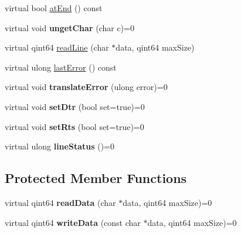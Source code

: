 \begin{DoxyCompactItemize}
\item 
virtual bool \mbox{\hyperlink{class_qext_serial_base_a06cb503e03af3a372abc715ac7fbb63c}{at\+End}} () const
\item 
\mbox{\label{class_qext_serial_base_ad4564cb1b1fdfb317e6a12cb5b351adf}} 
virtual void {\bfseries unget\+Char} (char c)=0
\item 
virtual qint64 \mbox{\hyperlink{class_qext_serial_base_aee681a896845c9594c84dcd47d7eb566}{read\+Line}} (char $\ast$data, qint64 max\+Size)
\item 
virtual ulong \mbox{\hyperlink{class_qext_serial_base_a5889db7f578e11db0c7980de3720deea}{last\+Error}} () const
\item 
\mbox{\label{class_qext_serial_base_aa9c2e9272cff3bd576560335308a8033}} 
virtual void {\bfseries translate\+Error} (ulong error)=0
\item 
\mbox{\label{class_qext_serial_base_a14c7fc36f9e7b7e5a9e798c2c1b35505}} 
virtual void {\bfseries set\+Dtr} (bool set=true)=0
\item 
\mbox{\label{class_qext_serial_base_aaa23d343095f16e7d7b37e7b61022b3a}} 
virtual void {\bfseries set\+Rts} (bool set=true)=0
\item 
\mbox{\label{class_qext_serial_base_a28b87dd41160a61e2953dca38aa332d6}} 
virtual ulong {\bfseries line\+Status} ()=0
\end{DoxyCompactItemize}
\subsection*{Protected Member Functions}
\begin{DoxyCompactItemize}
\item 
\mbox{\label{class_qext_serial_base_ad36903893a43ad4468e25243117dea73}} 
virtual qint64 {\bfseries read\+Data} (char $\ast$data, qint64 max\+Size)=0
\item 
\mbox{\label{class_qext_serial_base_a39a3aaff93640b767fd44dd7ce705e01}} 
virtual qint64 {\bfseries write\+Data} (const char $\ast$data, qint64 max\+Size)=0
\end{DoxyCompactItemize}
